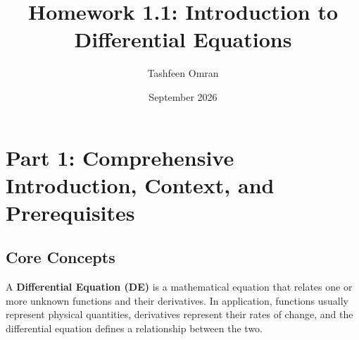 \documentclass[11pt]{article}
\title{\textbf{Homework 1.1: Introduction to Differential Equations}}
\author{Tashfeen Omran}
\date{September 2026}
\begin{document}
\maketitle
\tableofcontents
\vspace{1cm}

\section{Part 1: Comprehensive Introduction, Context, and Prerequisites}

\subsection{Core Concepts}
A \textbf{Differential Equation (DE)} is a mathematical equation that relates one or more unknown functions and their derivatives. In application, functions usually represent physical quantities, derivatives represent their rates of change, and the differential equation defines a relationship between the two. 
\end{document}
